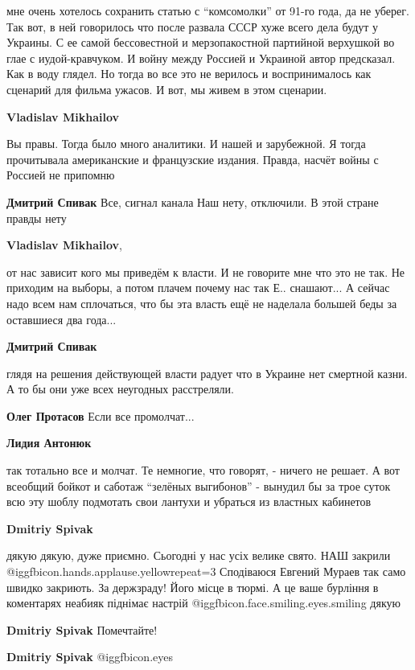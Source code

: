 \begin{itemize}
\begin{itemize}
мне очень хотелось сохранить статью с \enquote{комсомолки} от 91-го года, да не уберег.
Так вот, в ней говорилось что после развала СССР хуже всего дела будут у
Украины. С ее самой бессовестной и мерзопакостной партийной верхушкой во глае с
иудой-кравчуком. И войну между Россией и Украиной автор предсказал. Как в воду
глядел. Но тогда во все это не верилось и воспринималось как сценарий для
фильма ужасов. И вот, мы живем в этом сценарии.

\textbf{Vladislav Mikhailov} 

Вы правы. Тогда было много аналитики. И нашей и зарубежной. Я тогда прочитывала
американские и французские издания. Правда, насчёт войны с Россией не припомню

\textbf{Дмитрий Спивак} Все, сигнал канала Наш нету, отключили. В этой стране правды нету

\textbf{Vladislav Mikhailov}, 

от нас зависит кого мы приведём к власти. И не говорите мне что это не так. Не
приходим на выборы, а потом плачем почему нас так Е.. снашают... А сейчас надо
всем нам сплочаться, что бы эта власть ещё не наделала большей беды за
оставшиеся два года...

\textbf{Дмитрий Спивак} 

глядя на решения действующей власти радует что в Украине нет смертной казни. А
то бы они уже всех неугодных расстреляли.

\textbf{Олег Протасов} Если все промолчат...

\textbf{Лидия Антонюк} 

так тотально все и молчат. Те немногие, что говорят, - ничего не решает. А вот
всеобщий бойкот и саботаж \enquote{зелёных выгибонов} - вынудил бы за трое суток всю
эту шоблу подмотать свои лантухи и убраться из властных кабинетов

\textbf{Dmitriy Spivak} 

дякую дякую, дуже приємно. Сьогодні у нас усіх велике свято. НАШ закрили  @igg{fbicon.hands.applause.yellow}{repeat=3} 
Сподіваюся Евгений Мураев так само швидко закриють. За держзраду! Його місце в тюрмі.
А це ваше бурління в коментарях неабияк піднімає настрій  @igg{fbicon.face.smiling.eyes.smiling}  дякую

\textbf{Dmitriy Spivak} Помечтайте!

\textbf{Dmitriy Spivak}  @igg{fbicon.eyes} 


\end{itemize}
\end{itemize}
